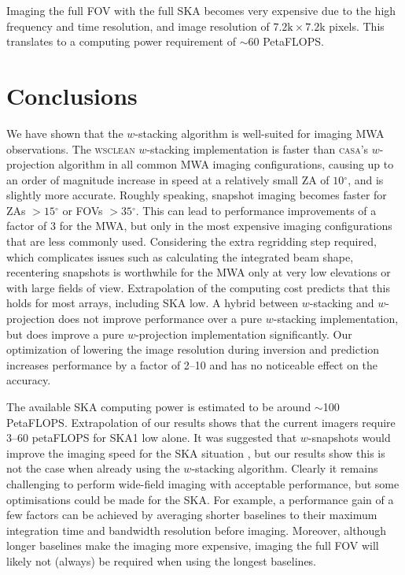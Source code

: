 \documentclass[useAMS,usenatbib]{mn2e}
\newcommand{\degree}{\ensuremath{^{\circ}}\xspace}
\begin{document}
Imaging the full FOV with the full SKA becomes very expensive due to the high frequency and time resolution, and image resolution of $7.2\textrm{k} \times 7.2$k pixels. This translates to a computing power requirement of $\sim60$ PetaFLOPS.

\section{Conclusions} \label{sec:conclusions}
We have shown that the $w$-stacking algorithm is well-suited for imaging MWA observations. The \textsc{wsclean} $w$-stacking implementation is faster than \textsc{casa}'s $w$-projection algorithm in all common MWA imaging configurations, causing up to an order of magnitude increase in speed at a relatively small ZA of $10$\degree, and is slightly more accurate. Roughly speaking, snapshot imaging becomes faster for ZAs $>15\degree$ or FOVs $>35\degree$. This can lead to performance improvements of a factor of $3$ for the MWA, but only in the most expensive imaging configurations that are less commonly used. Considering the extra regridding step required, which complicates issues such as calculating the integrated beam shape, recentering snapshots is worthwhile for the MWA only at very low elevations or with large fields of view. Extrapolation of the computing cost predicts that this holds for most arrays, including SKA low. A hybrid between $w$-stacking and $w$-projection does not improve performance over a pure $w$-stacking implementation, but does improve a pure $w$-projection implementation significantly. Our optimization of lowering the image resolution during inversion and prediction increases performance by a factor of 2--10 and has no noticeable effect on the accuracy.

The available SKA computing power is estimated to be around $\sim$100 PetaFLOPS. Extrapolation of our results shows that the current imagers require $3$--$60$ petaFLOPS for SKA1 low alone. It was suggested that $w$-snapshots would improve the imaging speed for the SKA situation \citep{widefield-imaging-ska-cornwell}, but our results show this is not the case when already using the $w$-stacking algorithm. Clearly it remains challenging to perform wide-field imaging with acceptable performance, but some optimisations could be made for the SKA. For example, a performance gain of a few factors can be achieved by averaging shorter baselines to their maximum integration time and bandwidth resolution before imaging. Moreover, although longer baselines make the imaging more expensive, imaging the full FOV will likely not (always) be required when using the longest baselines.
\end{document}
